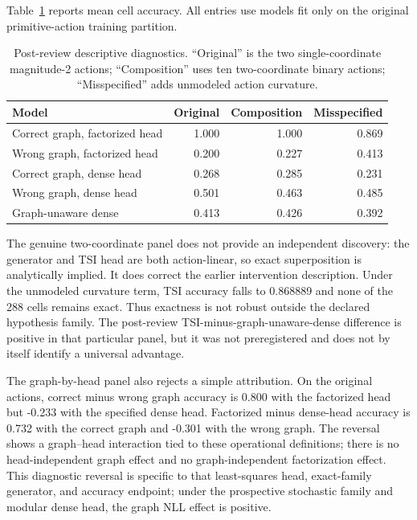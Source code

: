 Table~\ref{tab:postreview} reports mean cell accuracy.  All entries use models
fit only on the original primitive-action training partition.

\begin{table}[ht]
\centering
\small
\caption{Post-review descriptive diagnostics.  ``Original'' is the two
single-coordinate magnitude-2 actions; ``Composition'' uses ten two-coordinate
binary actions; ``Misspecified'' adds unmodeled action curvature.}
\label{tab:postreview}
\begin{tabular}{lrrr}
\toprule
Model & Original & Composition & Misspecified\\
\midrule
Correct graph, factorized head & 1.000 & 1.000 & 0.869\\
Wrong graph, factorized head & 0.200 & 0.227 & 0.413\\
Correct graph, dense head & 0.268 & 0.285 & 0.231\\
Wrong graph, dense head & 0.501 & 0.463 & 0.485\\
Graph-unaware dense & 0.413 & 0.426 & 0.392\\
\bottomrule
\end{tabular}
\end{table}

The genuine two-coordinate panel does not provide an independent discovery:
the generator and TSI head are both action-linear, so exact superposition is
analytically implied.  It does correct the earlier intervention description.
Under the unmodeled curvature term, TSI accuracy falls to 0.868889 and none of
the 288 cells remains exact.  Thus exactness is not robust outside the declared
hypothesis family.  The post-review TSI-minus-graph-unaware-dense difference is
positive in that particular panel, but it was not preregistered and does not by
itself identify a universal advantage.

The graph-by-head panel also rejects a simple attribution.  On the original
actions, correct minus wrong graph accuracy is 0.800 with the factorized head
but -0.233 with the specified dense head.  Factorized minus dense-head accuracy
is 0.732 with the correct graph and -0.301 with the wrong graph.  The reversal
shows a graph--head interaction tied to these operational definitions; there is
no head-independent graph effect and no graph-independent factorization effect.
This diagnostic reversal is specific to that least-squares head, exact-family
generator, and accuracy endpoint; under the prospective stochastic family and
modular dense head, the graph NLL effect is positive.

